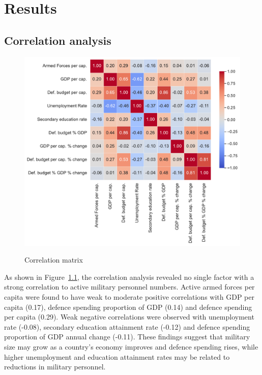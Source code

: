 \chapter{Results}

\section{Correlation analysis}

\begin{figure}[htbp]
    \caption{Correlation matrix}
    \centering
    \includegraphics[width=1\textwidth]{images/correlation_heatmap.pdf}
    \label{fig:correlation_heatmap}
\end{figure}

As shown in Figure~\ref{fig:correlation_heatmap}, the correlation analysis revealed no single factor with a strong correlation to active military personnel numbers.
Active armed forces per capita were found to have weak to moderate positive correlations with GDP per 
capita (0.17), defence spending proportion of GDP (0.14) and defence spending per capita (0.29).
Weak negative correlations were observed with unemployment rate
(-0.08), secondary education attainment rate (-0.12) and defence spending proportion of GDP annual 
change (-0.11). These findings suggest that military size may grow as a country's economy improves 
and defence spending rises, while higher unemployment and education attainment rates may be related 
to reductions in military personnel.

